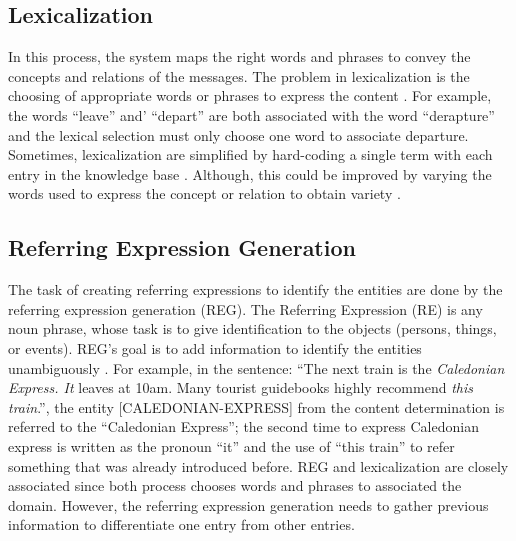 \subsection{Lexicalization}
In this process, the system maps the right words and phrases to convey the concepts and relations of the messages. The problem in lexicalization is the choosing of appropriate words or phrases to express the content \cite{JurafskyMartin2000}. For example, the words ``leave'' and' ``depart'' are both associated with the word ``derapture'' and the lexical selection must only choose one word to associate departure. Sometimes, lexicalization are simplified by hard-coding a single term with each entry in the knowledge base \cite{JurafskyMartin2000}. Although, this could be improved by varying the words used to express the concept or relation to obtain variety \cite{ReiterDale1997}. 

\subsection{Referring Expression Generation}
The task of creating referring expressions to identify the entities are done by the referring expression generation (REG). The Referring Expression (RE) is any noun phrase, whose task is to give identification to the objects (persons, things, or events). REG's goal is to add information to identify the entities unambiguously \cite{ReiterDale1997}. For example, in the sentence: ``The next train is the \textit{Caledonian Express. It} leaves at 10am. Many tourist guidebooks highly recommend \textit{this train}.'', the entity [CALEDONIAN-EXPRESS] from the content determination is referred to the ``Caledonian Express''; the second time to express Caledonian express is written as the pronoun ``it'' and  the use of ``this train'' to refer something that was already introduced before. REG and lexicalization are closely associated since both process chooses words and phrases to associated the domain. However, the referring expression generation needs to gather previous information to differentiate one entry from other entries. 


